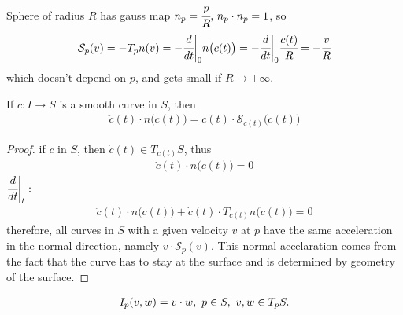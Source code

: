 \documentclass[10pt]{article}
\begin{document}
		\begin{example}\label{Example: the guass map of sphere}
			Sphere of radius $R$ has gauss map $n_p = \cfrac{p}{R},\thinspace n_p\cdot n_p = 1$, so
			\begin{equation*}
				\begin{aligned}
					\mathcal{S}_p(v) = -T_pn(v) = -\cfrac{d}{dt}\bigg|_0n\big( c(t) \big) = -\cfrac{d}{dt}\bigg|_0\cfrac{c(t)}{R} = -\cfrac{v}{R}
				\end{aligned}
			\end{equation*}
			which doesn't depend on $p$, and gets small if $R\rightarrow +\infty$.
		\end{example}

		\begin{proposition}
			If $c: I\rightarrow S$ is a smooth curve in $S$, then
			\begin{equation*}
				\begin{aligned}
					\ddot{c}(t)\cdot n\big(c(t)\big) = \dot{c}(t)\cdot\mathcal{S}_{c(t)}\big( \dot{c}(t) \big)
				\end{aligned}
			\end{equation*}
		\end{proposition}

		\begin{proof}
			if $c$ in $S$, then $\dot{c}(t)\in T_{c(t)}S$, thus
			\begin{equation*}
				\begin{aligned}
					\dot{c}(t)\cdot n\big(c(t)\big) = 0
				\end{aligned}
			\end{equation*}
			$\cfrac{d}{dt}\bigg|_t:$
			\begin{equation*}
				\begin{aligned}
					\ddot{c}(t)\cdot n\big(c(t)\big) + \dot{c}(t)\cdot T_{c(t)}n\big(\dot{c}(t)\big) = 0
				\end{aligned}
			\end{equation*}
			therefore, all curves in $S$ with a given velocity $v$ at $p$ have the same acceleration in the normal direction, namely $v\cdot\mathcal{S}_p(v)$. This normal accelaration comes from the fact that the curve has to stay at the surface and is determined by geometry of the surface.
		\end{proof}


		\begin{definition}
			\begin{equation*}
				\begin{aligned}
					I_p(v,w) = v\cdot w, \thinspace\thinspace p\in S, \thinspace\thinspace v,w\in T_pS.
				\end{aligned}
			\end{equation*}
		\end{definition}
\end{document}
